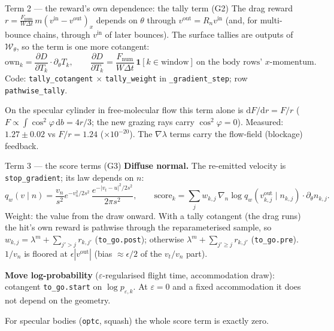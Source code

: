 \documentclass[10pt,aspectratio=169]{beamer}
\newcommand{\ind}{\mathbf{1}}
\newcommand{\dd}{\mathrm{d}}
\newcommand{\code}[1]{\texttt{\small #1}}
\begin{document}
\begin{frame}{Term 2 --- the reward's own dependence: the tally term (G2)}
The drag reward $r = \frac{F_{\mathrm{num}}}{W\Delta t}\,m(v^{\mathrm{in}} - v^{\mathrm{out}})_x$ depends on $\theta$
through $v^{\mathrm{out}} = R_n v^{\mathrm{in}}$ (and, for multi-bounce chains, through $v^{\mathrm{in}}$ of later
bounces).  The surface tallies are outputs of $\mathcal W_\theta$, so the term is one more
cotangent:
\[
\text{own}_k = \frac{\partial D}{\partial T_k}\cdot\partial_\theta T_k,\qquad
\frac{\partial D}{\partial T_k} = \frac{F_{\mathrm{num}}}{W\Delta t}\,\ind[k\in\text{window}]\ \text{on the body rows' } x\text{-momentum}.
\]
Code: \code{tally\_cotangent} $\times$ \code{tally\_weight} in \code{\_gradient\_step}; row
\code{pathwise\_tally}.

\medskip
On the specular cylinder in free-molecular flow this term alone is $\dd F/\dd r = F/r$
($F\propto\int\cos^2\varphi\,\dd b = 4r/3$; the new grazing rays carry $\cos^2\varphi = 0$).
Measured: $1.27\pm0.02$ vs $F/r = 1.24$ ($\times10^{-20}$).  The $\nabla\lambda$ terms carry the
flow-field (blockage) feedback.
\end{frame}

\begin{frame}{Term 3 --- the score terms (G3)}
\textbf{Diffuse normal.}  The re-emitted velocity is \code{stop\_gradient}; its law depends
on $n$:
\[
q_w(v\mid n) = \frac{v_n}{s^2}e^{-v_n^2/2s^2}\,\frac{e^{-|v_t - u|^2/2s^2}}{2\pi s^2},\qquad
\text{score}_k = \sum_j w_{k,j}\,\nabla_n\log q_w(v^{\mathrm{out}}_{k,j}\mid n_{k,j})\cdot\partial_\theta n_{k,j}.
\]
Weight: the value from the draw onward.  With a tally cotangent (the drag runs) the hit's
own reward is pathwise through the reparameterised sample, so
$w_{k,j} = \lambda^m + \sum_{j'>j} r_{k,j'}$ (\code{to\_go.post}); otherwise
$\lambda^m + \sum_{j'\ge j} r_{k,j'}$ (\code{to\_go.pre}).  $1/v_n$ is floored at
$\epsilon|v^{\mathrm{out}}|$ (bias $\approx\epsilon/2$ of the $v_t/v_n$ part).

\medskip
\textbf{Move log-probability} ($\varepsilon$-regularised flight time, accommodation draw):
cotangent \code{to\_go.start} on $\log p_{\varepsilon,k}$.  At $\varepsilon = 0$ and a fixed
accommodation it does not depend on the geometry.

\medskip
For specular bodies (\code{optc}, squash) the whole score term is exactly zero.
\end{frame}
\end{document}
